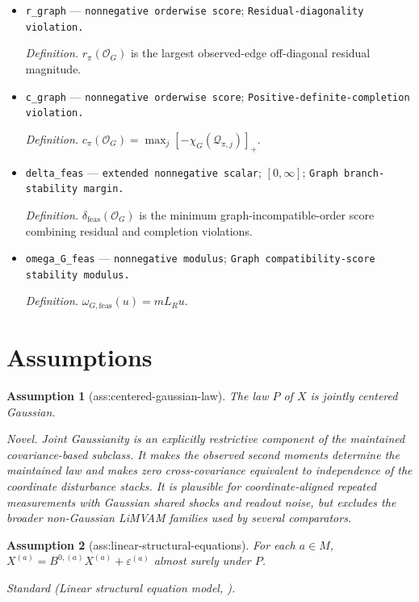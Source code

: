\documentclass{article}
\newtheorem{assumption}{Assumption}
\begin{document}
\begin{itemize}
  \item \texttt{r\_\allowbreak{}graph} --- \texttt{nonnegative orderwise score}; \texttt{Residual-\allowbreak{}diagonality violation.}
  \par\smallskip\noindent\emph{Definition.} \(r_\pi(\mathcal O_G)\) is the largest observed-edge off-diagonal residual magnitude.
  \item \texttt{c\_\allowbreak{}graph} --- \texttt{nonnegative orderwise score}; \texttt{Positive-\allowbreak{}definite-\allowbreak{}completion violation.}
  \par\smallskip\noindent\emph{Definition.} \(c_\pi(\mathcal O_G)=\max_j[-\chi_G(\mathcal Q_{\pi,j})]_+\).
  \item \texttt{delta\_\allowbreak{}feas} --- \texttt{extended nonnegative scalar}; \([0,\infty]\); \texttt{Graph branch-\allowbreak{}stability margin.}
  \par\smallskip\noindent\emph{Definition.} \(\delta_{\mathrm{feas}}(\mathcal O_G)\) is the minimum graph-incompatible-order score combining residual and completion violations.
  \item \texttt{omega\_\allowbreak{}G\_\allowbreak{}feas} --- \texttt{nonnegative modulus}; \texttt{Graph compatibility-\allowbreak{}score stability modulus.}
  \par\smallskip\noindent\emph{Definition.} \(\omega_{G,\mathrm{feas}}(u)=mL_Ru\).
\end{itemize}

\section{Assumptions}

\begin{assumption}[ass:centered-gaussian-law]\label{ass:centered-gaussian-law}
The law \(P\) of \(X\) is jointly centered Gaussian.
\par\smallskip\noindent\emph{Novel.} Joint Gaussianity is an explicitly restrictive component of the maintained covariance-based subclass. It makes the observed second moments determine the maintained law and makes zero cross-covariance equivalent to independence of the coordinate disturbance stacks. It is plausible for coordinate-aligned repeated measurements with Gaussian shared shocks and readout noise, but excludes the broader non-Gaussian LiMVAM families used by several comparators.
\end{assumption}

\begin{assumption}[ass:linear-structural-equations]\label{ass:linear-structural-equations}
For each \(a\in M\), \(X^{(a)}=B^{0,(a)}X^{(a)}+\varepsilon^{(a)}\) almost surely under \(P\).
\par\smallskip\noindent\emph{Standard} (Linear structural equation model, \cite{HeurtebiseEtAl2026LiMVAM}).
\end{assumption}
\end{document}
